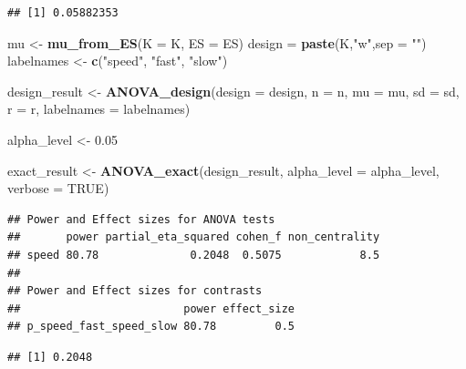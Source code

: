 \documentclass[]{book}
\newenvironment{Shaded}{\begin{snugshade}}{\end{snugshade}}
\newcommand{\DataTypeTok}[1]{\textcolor[rgb]{0.13,0.29,0.53}{#1}}
\newcommand{\FloatTok}[1]{\textcolor[rgb]{0.00,0.00,0.81}{#1}}
\newcommand{\KeywordTok}[1]{\textcolor[rgb]{0.13,0.29,0.53}{\textbf{#1}}}
\newcommand{\NormalTok}[1]{#1}
\newcommand{\OperatorTok}[1]{\textcolor[rgb]{0.81,0.36,0.00}{\textbf{#1}}}
\newcommand{\OtherTok}[1]{\textcolor[rgb]{0.56,0.35,0.01}{#1}}
\newcommand{\StringTok}[1]{\textcolor[rgb]{0.31,0.60,0.02}{#1}}
\begin{document}
\begin{verbatim}
## [1] 0.05882353
\end{verbatim}

\begin{Shaded}
\begin{Highlighting}[]
\NormalTok{mu <-}\StringTok{ }\KeywordTok{mu_from_ES}\NormalTok{(}\DataTypeTok{K =}\NormalTok{ K, }\DataTypeTok{ES =}\NormalTok{ ES)}
\NormalTok{design =}\StringTok{ }\KeywordTok{paste}\NormalTok{(K,}\StringTok{"w"}\NormalTok{,}\DataTypeTok{sep =} \StringTok{""}\NormalTok{)}
\NormalTok{labelnames <-}\StringTok{ }\KeywordTok{c}\NormalTok{(}\StringTok{"speed"}\NormalTok{, }\StringTok{"fast"}\NormalTok{, }\StringTok{"slow"}\NormalTok{)}

\NormalTok{design_result <-}\StringTok{ }\KeywordTok{ANOVA_design}\NormalTok{(}\DataTypeTok{design =}\NormalTok{ design,}
                   \DataTypeTok{n =}\NormalTok{ n, }
                   \DataTypeTok{mu =}\NormalTok{ mu, }
                   \DataTypeTok{sd =}\NormalTok{ sd, }
                   \DataTypeTok{r =}\NormalTok{ r, }
                   \DataTypeTok{labelnames =}\NormalTok{ labelnames)}

\NormalTok{alpha_level <-}\StringTok{ }\FloatTok{0.05}

\NormalTok{exact_result <-}\StringTok{ }\KeywordTok{ANOVA_exact}\NormalTok{(design_result,}
                            \DataTypeTok{alpha_level =}\NormalTok{ alpha_level,}
                            \DataTypeTok{verbose =} \OtherTok{TRUE}\NormalTok{)}
\end{Highlighting}
\end{Shaded}

\begin{verbatim}
## Power and Effect sizes for ANOVA tests
##       power partial_eta_squared cohen_f non_centrality
## speed 80.78              0.2048  0.5075            8.5
## 
## Power and Effect sizes for contrasts
##                         power effect_size
## p_speed_fast_speed_slow 80.78         0.5
\end{verbatim}

\begin{Shaded}
\end{Shaded}

\begin{verbatim}
## [1] 0.2048
\end{verbatim}
\end{document}
